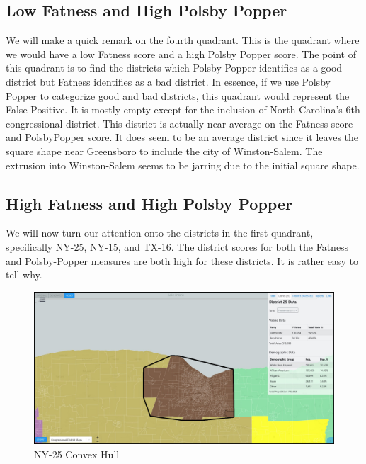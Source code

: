 \documentclass[letterpaper]{article}
\begin{document}
\subsection{Low Fatness and High Polsby Popper}
We will make a quick remark on the fourth quadrant. This is the quadrant where we would have a low Fatness score and a high Polsby Popper score. The point of this quadrant is to find the districts which Polsby Popper identifies as a good district but Fatness identifies as a bad district. In essence, if we use Polsby Popper to categorize good and bad districts, this quadrant would represent the False Positive. It is mostly empty except for the inclusion of North Carolina's 6th congressional district.
This district is actually near average on the Fatness score and PolsbyPopper score. It does seem to be an average district since it leaves the square shape near Greensboro to include the city of Winston-Salem. The extrusion into Winston-Salem seems to be jarring due to the initial square shape.

\subsection{High Fatness and High Polsby Popper}
We will now turn our attention onto the districts in the first quadrant, specifically NY-25, NY-15, and TX-16. The district scores for both the Fatness and Polsby-Popper measures are both high for these districts. It is rather easy to tell why.

\begin{figure}[H]
	\includegraphics[width=\linewidth]{./figures/NY-25-ConvexHull.png}
	\caption{NY-25 Convex Hull}
	\label{fig:ny25convexHull}
\end{figure}
\end{document}
